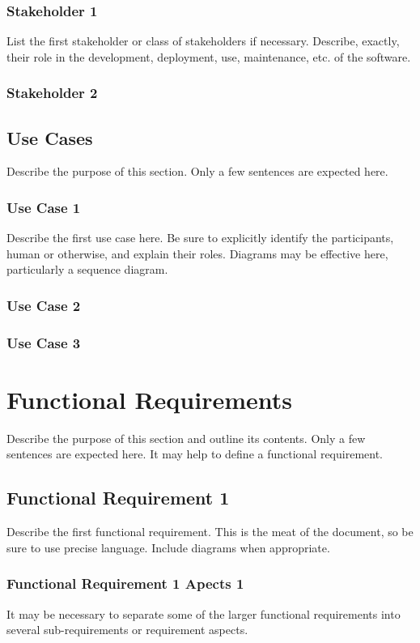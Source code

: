 \documentclass{article}
\begin{document}
\subsubsection{Stakeholder 1}
List the first stakeholder or class of stakeholders if necessary. Describe, exactly, their role in the development, deployment, use, maintenance, etc. of the software.
\subsubsection{Stakeholder 2}

\subsection{Use Cases}
Describe the purpose of this section. Only a few sentences are expected here.

\subsubsection{Use Case 1}
Describe the first use case here. Be sure to explicitly identify the participants, human or otherwise, and explain their roles. Diagrams may be effective here, particularly a sequence diagram.

\subsubsection{Use Case 2}

\subsubsection{Use Case 3}

\section{Functional Requirements}
Describe the purpose of this section and outline its contents. Only a few sentences are expected here. It may help to define a functional requirement.

\subsection{Functional Requirement 1}
Describe the first functional requirement. This is the meat of the document, so be sure to use precise language. Include diagrams when appropriate.

\subsubsection{Functional Requirement 1 Apects 1}
It may be necessary to separate some of the larger functional requirements into several sub-requirements or requirement aspects.
\end{document}
